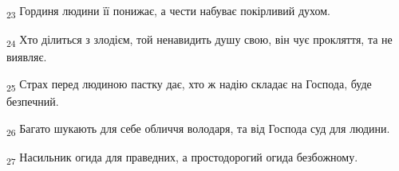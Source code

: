 \begin{tcolorbox}
\textsubscript{23} Гординя людини її понижає, а чести набуває покірливий духом.
\end{tcolorbox}
\begin{tcolorbox}
\textsubscript{24} Хто ділиться з злодієм, той ненавидить душу свою, він чує прокляття, та не виявляє.
\end{tcolorbox}
\begin{tcolorbox}
\textsubscript{25} Страх перед людиною пастку дає, хто ж надію складає на Господа, буде безпечний.
\end{tcolorbox}
\begin{tcolorbox}
\textsubscript{26} Багато шукають для себе обличчя володаря, та від Господа суд для людини.
\end{tcolorbox}
\begin{tcolorbox}
\textsubscript{27} Насильник огида для праведних, а простодорогий огида безбожному.
\end{tcolorbox}

